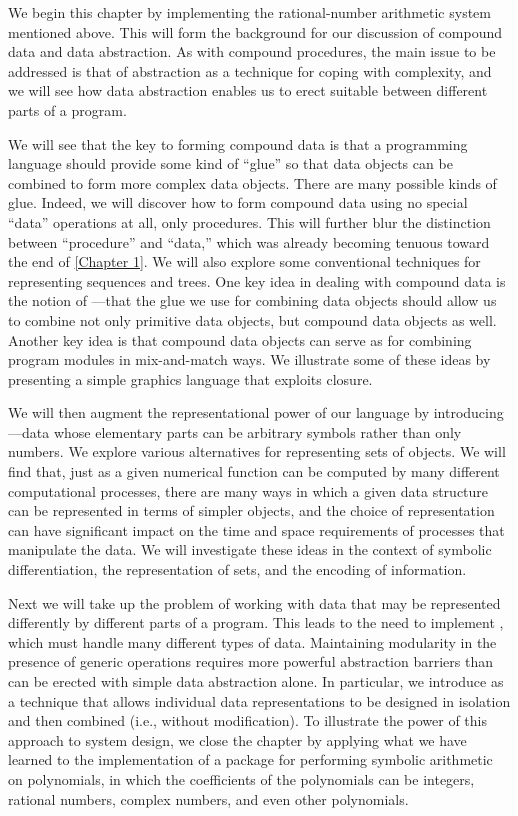We begin this chapter by implementing the rational-number arithmetic system mentioned above.
This will form the background for our discussion of compound data and data abstraction.
As with compound procedures, the main issue to be addressed is that of abstraction as a technique for coping with complexity, and we will see how data abstraction enables us to erect suitable  between different parts of a program.

We will see that the key to forming compound data is that a programming language should provide some kind of “glue” so that data objects can be combined to form more complex data objects.
There are many possible kinds of glue.
Indeed, we will discover how to form compound data using no special “data” operations at all, only procedures.
This will further blur the distinction between “procedure” and “data,” which was already becoming tenuous toward the end of \cref{Chapter 1}.
We will also explore some conventional techniques for representing sequences and trees.
One key idea in dealing with compound data is the notion of ---that the glue we use for combining data objects should allow us to combine not only primitive data objects, but compound data objects as well.
Another key idea is that compound data objects can serve as  for combining program modules in mix-and-match ways.
We illustrate some of these ideas by presenting a simple graphics language that exploits closure.

We will then augment the representational power of our language by introducing ---data whose elementary parts can be arbitrary symbols rather than only numbers.
We explore various alternatives for representing sets of objects.
We will find that, just as a given numerical function can be computed by many different computational processes, there are many ways in which a given data structure can be represented in terms of simpler objects, and the choice of representation can have significant impact on the time and space requirements of processes that manipulate the data.
We will investigate these ideas in the context of symbolic differentiation, the representation of sets, and the encoding of information.

Next we will take up the problem of working with data that may be represented differently by different parts of a program.
This leads to the need to implement , which must handle many different types of data.
Maintaining modularity in the presence of generic operations requires more powerful abstraction barriers than can be erected with simple data abstraction alone.
In particular, we introduce  as a technique that allows individual data representations to be designed in isolation and then combined  (i.e., without modification).
To illustrate the power of this approach to system design, we close the chapter by applying what we have learned to the implementation of a package for performing symbolic arithmetic on polynomials, in which the coefficients of the polynomials can be integers, rational numbers, complex numbers, and even other polynomials.






